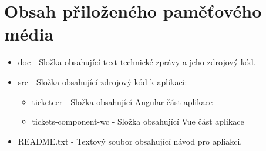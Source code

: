 \chapter{Obsah přiloženého paměťového média}

\begin{itemize}
    \item doc - Složka obsahující text technické zprávy a jeho zdrojový kód.
    \item src - Složka obsahující zdrojový kód k aplikaci:
        \begin{itemize}
            \item ticketeer - Složka obsahující Angular část aplikace
            \item tickets-component-wc - Složka obsahující Vue část aplikace
        \end{itemize}
    \item README.txt - Textový soubor obsahující návod pro apliakci.
\end{itemize}                   